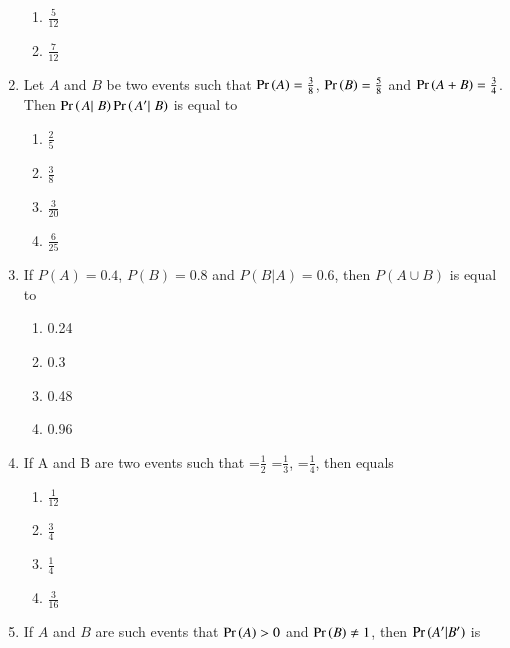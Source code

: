 \begin{enumerate}[label=\thesubsection.\arabic*,ref=\thesubsection.\theenumi,resume*]
\begin{multicols}{4}
\begin{enumerate}
	\item $\frac{5}{12}$
	\item $\frac{7}{12}$
\end{enumerate}
\end{multicols}
\solution

\item Let $A$ and $B$ be two  events such that $\Pr\left(A\right) = \frac{3}{8}$, $\Pr\left(B\right) = \frac{5}{8}$ and $\Pr\left(A+B\right) = \frac{3}{4}$. Then $\Pr\left(\left.{A}|\right.{B}\right)\Pr\left(\left.{A^\prime} |\right.{B}\right)$ is equal to
\begin{multicols}{4}
\begin{enumerate}
\item $\frac{2}{5}$
\vspace{3pt}
\item $\frac{3}{8}$
\vspace{3pt}
\item $\frac{3}{20}$
\vspace{3pt}
\item $\frac{6}{25}$
\end{enumerate}
\end{multicols}
\solution

\item If $P(A)=0.4$, $P(B)=0.8$ and $P(B|A)=0.6$, then $P(A \cup B)$ is equal to
\begin{multicols}{4}
\begin{enumerate}
\item 0.24
\item 0.3
\item 0.48
\item 0.96
\end{enumerate}
\end{multicols}
\solution

\item If A and B are two events such that  =$\frac{1}{2}$  =$\frac{1}{3}$, =$\frac{1}{4}$, then  equals
\begin{multicols}{4}
\begin{enumerate}
	\item $\frac{1}{12}$
	\item $\frac{3}{4}$
	\item $\frac{1}{4}$
	\item $\frac{3}{16}$	
\end{enumerate}
\end{multicols}
\solution

\item If $A$ and $B$ are such events that $\Pr\left(A\right) > 0$ and $\Pr\left(B\right)\neq 1$, then $\Pr\left(A^\prime|B^\prime\right)$ is

\end{enumerate}
